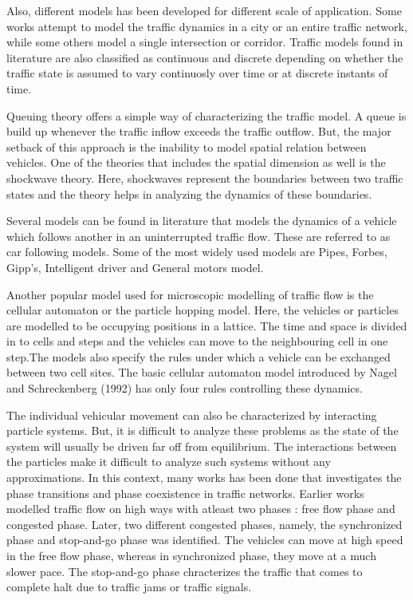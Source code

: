 \documentclass[a4paper,12pt]{scrartcl}
\begin{document}
Also, different models has been developed for different scale of application. Some works attempt to model the traffic dynamics in a city or an entire traffic network, while some others model a single intersection or corridor. Traffic models found in literature are also classified as continuous and discrete depending on whether the traffic state is assumed to vary continuosly over time or at discrete instants of time.

Queuing theory offers a simple way of characterizing the traffic model. 
A queue is build up whenever the traffic inflow exceeds the traffic outflow. 
But, the major setback of this approach is the inability to model spatial relation between vehicles. One of the theories that includes the spatial dimension as well is the shockwave theory.
Here, shockwaves represent the boundaries between two traffic states and the theory helps in analyzing the dynamics of these boundaries.

Several models can be found in literature that models the dynamics of a vehicle which follows another in an uninterrupted traffic flow. These are referred to as car following models.
Some of the most widely used models are Pipes, Forbes, Gipp's, Intelligent driver and General motors model. 

Another popular model used for microscopic modelling of traffic flow is the cellular automaton or the particle hopping model. Here, the vehicles or particles are modelled to be occupying positions in a lattice. The time and space is divided in to cells and steps and the vehicles can move to the neighbouring cell in one step.The models also specify the rules under which a vehicle can be exchanged between two cell sites. The basic cellular automaton model introduced by Nagel and Schreckenberg (1992) has only four rules controlling these dynamics.

The individual vehicular movement can also be characterized by interacting particle systems. But, it is difficult to analyze these problems as the state of the system will usually be driven far off from equilibrium. The interactions between the particles make it difficult to analyze such systems without any approximations. In this context, many works has been done that investigates the phase transitions and phase coexistence in traffic networks. Earlier works modelled traffic flow on high ways with atleast two phases : free flow phase and congested phase. Later, two different congested phases, namely, the synchronized phase and stop-and-go phase was identified. The vehicles can move at high speed in the free flow phase, whereas in synchronized phase, they move at a much slower pace. The stop-and-go phase chracterizes the traffic that comes to complete halt due to traffic jams or traffic signals. 



\newpage




    
\end{document}
